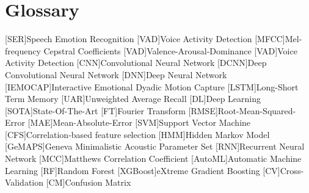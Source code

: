 \chapter{Glossary}

\footnotesize
\SingleSpacing

\begin{multicols}{2}
\begin{acronym}[AAAAAA]
    [SER]{Speech Emotion Recognition}
    [VAD]{Voice Activity Detection}
    [MFCC]{Mel-frequency Cepstral Coefficients}
    [VAD]{Valence-Arousal-Dominance}
    [VAD]{Voice Activity Detection}
    [CNN]{Convolutional Neural Network}
    [DCNN]{Deep Convolutional Neural Network}
    [DNN]{Deep Neural Network}
    [IEMOCAP]{Interactive Emotional Dyadic Motion Capture}
    [LSTM]{Long-Short Term Memory}
    [UAR]{Unweighted Average Recall}
    [DL]{Deep Learning}
    [SOTA]{State-Of-The-Art}
    [FT]{Fourier Transform}
    [RMSE]{Root-Mean-Squared-Error}
    [MAE]{Mean-Absolute-Error}
    [SVM]{Support Vector Machine}
    [CFS]{Correlation-based feature selection}
    [HMM]{Hidden Markov Model}
    [GeMAPS]{Geneva Minimalistic Acoustic Parameter Set}
    [RNN]{Recurrent Neural Network}
    [MCC]{Matthews Correlation Coefficient}
    [AutoML]{Automatic Machine Learning}
    [RF]{Random Forest}
    [XGBoost]{eXtreme Gradient Boosting}
    [CV]{Cross-Validation}
    [CM]{Confusion Matrix}
\end{acronym}
\end{multicols}

